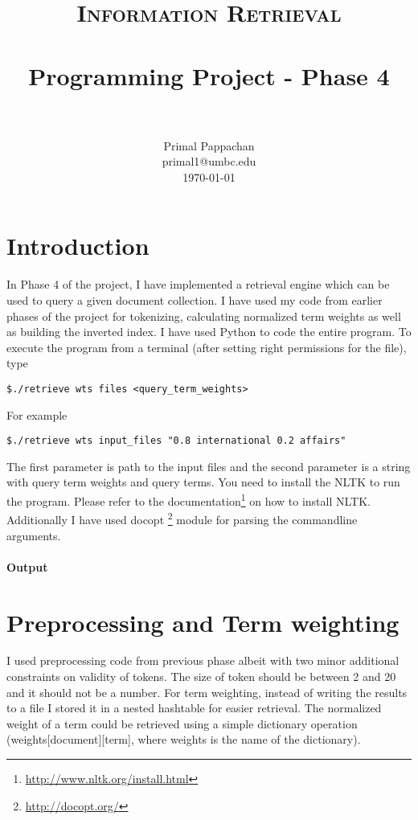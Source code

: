 \documentclass[paper=a4, fontsize=11pt]{scrartcl}
\title{
		\usefont{OT1}{bch}{b}{n}
		\normalfont \normalsize \textsc{Information Retrieval} \\ [25pt]
		\horrule{0.5pt} \\[0.4cm]
		\huge Programming Project - Phase 4 \\
		\horrule{2pt} \\[0.5cm]
}
\author{
		\normalfont 								\normalsize
        Primal Pappachan\\[-3pt]		\normalsize
        primal1@umbc.edu\\[-3pt]		\normalsize
        \today
}
\date{}
\numberwithin{equation}{section}		%
\numberwithin{figure}{section}			%
\numberwithin{table}{section}				%
\begin{document}
\maketitle
\section{Introduction}
In Phase 4 of the project, I have implemented a retrieval engine which can be used to query a given document collection. I have used my code from earlier phases of the project for tokenizing, calculating normalized term weights as well as building the inverted index. I have used Python to code the entire program. To execute the program from a terminal (after setting right permissions for the file), type 

\begin{verbatim}
$./retrieve wts files <query_term_weights> 
\end{verbatim}

For example
\begin{verbatim}
$./retrieve wts input_files "0.8 international 0.2 affairs"
\end{verbatim}

The first parameter is path to the input files and the second parameter is a string with query term weights and query terms. You need to install the NLTK to run the program. Please refer to the documentation\footnote{\url{http://www.nltk.org/install.html}} on how to install NLTK. Additionally I have used docopt \footnote{\url{http://docopt.org/}} module for parsing the commandline arguments.

\paragraph{Output}


\section{Preprocessing and Term weighting}

I used preprocessing code from previous phase albeit with two minor additional constraints on validity of tokens. The size of token should be between 2 and 20 and it should not be a number. For term weighting, instead of writing the results to a file I stored it in a nested hashtable for easier retrieval. The normalized weight of a term could be retrieved using a simple dictionary operation (weights[document][term], where weights is the name of the dictionary).
\end{document}
